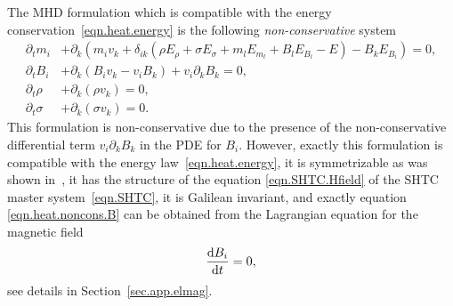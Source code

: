 \documentclass[twoside]{article}
\newcommand{\ted}{E} %
\newcommand{\pd}{\partial}
\newcommand{\rmd}{{\rm d}}
\newcommand{\IP}[1]{ \textcolor{blue}   {\small\texttt{
\texttt{[image: pin\_small.jpeg]} Ilya: #1}} }
\begin{document}
The MHD formulation which is compatible with the energy 
conservation~\eqref{eqn.heat.energy} is the following \textit{non-conservative} 
system
\begin{subequations}\label{eqn.heat.noncons}
	\begin{align}
\pd_t m_i  & + \pd _k \left (m_i v_k + \delta_{ik} \left( \rho \ted_\rho  + 
\sigma \ted_\sigma 	+ m_l\ted_{m_l} + B_l\ted_{B_l} - \ted \right) - 
B_k\ted_{B_i} \right ) = 
0,\label{eqn.heat.noncons.m}\\[1mm]
\pd_t B_i  & + \pd_k \left( B_i v_k - v_i B_k \right) + v_i \pd_k B_k = 
0,\label{eqn.heat.noncons.B}\\[1mm]
\pd_t \rho & +\pd_k (\rho v_k ) = 0,\label{eqn.heat.noncons.rho}\\[1mm]
\pd_t \sigma & +\pd_k (\sigma v_k ) = 0.\label{eqn.heat.noncons.s}
	\end{align}
\end{subequations}
This formulation is non-conservative due to the presence of 
the non-conservative differential term $ v_i \pd_k B_k $ in the PDE for $ B_i 
$. However, 
exactly this formulation is compatible with the energy 
law~\eqref{eqn.heat.energy}, it is symmetrizable as was shown 
in~\cite{God1972}, it 
has the structure of the 
equation \eqref{eqn.SHTC.Hfield} of the SHTC master 
system~\eqref{eqn.SHTC}, it is Galilean invariant, and 
exactly equation \eqref{eqn.heat.noncons.B} can be obtained from the Lagrangian 
equation for the magnetic field
\begin{equation}
\frac{\rmd B_i}{\rmd t} =0,
\end{equation}
see details in Section~\ref{sec.app.elmag}.
\end{document}
